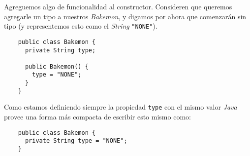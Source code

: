   Agreguemos algo de funcionalidad al constructor.
  Consideren que queremos agregarle un tipo a nuestros \textit{Bakemon}, y digamos por ahora que 
  comenzarán sin tipo (y representemos esto como el \textit{String} \texttt{"NONE"}).

  \begin{verbatim}
    public class Bakemon {
      private String type;

      public Bakemon() {
        type = "NONE";
      }
    }
  \end{verbatim}

  Como estamos definiendo siempre la propiedad \texttt{type} con el mismo valor \textit{Java} provee
  una forma más compacta de escribir esto mismo como:

  \begin{verbatim}
    public class Bakemon {
      private String type = "NONE";
    }
  \end{verbatim}